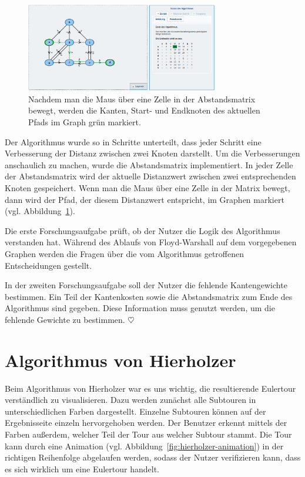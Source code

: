\begin{figure}[h!]
	\centering
	\includegraphics[width=0.75\textwidth]{figures/fw-matrix}
	\caption[Floyd-Warshall: Matrix]{Nachdem man die Maus über eine Zelle in der Abstandsmatrix bewegt, werden die Kanten, Start- und Endknoten des aktuellen Pfads im Graph grün markiert.}\label{fig:fw-matrix}
\end{figure}

Der Algorithmus wurde so in Schritte unterteilt, dass jeder Schritt eine Verbesserung der Distanz zwischen zwei Knoten darstellt. Um die Verbesserungen anschaulich zu machen, wurde die Abstandsmatrix implementiert. In jeder Zelle der Abstandsmatrix wird der aktuelle Distanzwert zwischen zwei entsprechenden Knoten gespeichert. Wenn man die Maus über eine Zelle in der Matrix bewegt, dann wird der Pfad, der diesem Distanzwert entspricht, im Graphen markiert (vgl. Abbildung~\ref{fig:fw-matrix}).

Die erste Forschungsaufgabe prüft, ob der Nutzer die Logik des Algorithmus verstanden hat. Während des Ablaufs von Floyd-Warshall auf dem vorgegebenen Graphen werden die Fragen über die vom Algorithmus getroffenen Entscheidungen gestellt.

In der zweiten Forschungsaufgabe soll der Nutzer die fehlende Kantengewichte bestimmen. Ein Teil der Kantenkosten sowie die Abstandsmatrix zum Ende des Algorithmus sind gegeben. Diese Information muss genutzt werden, um die fehlende Gewichte zu bestimmen. \hfill$\heartsuit$

\section{Algorithmus von Hierholzer} %
Beim Algorithmus von Hierholzer war es uns wichtig, die resultierende Eulertour verständlich zu visualisieren. Dazu werden zunächst alle Subtouren in unterschiedlichen Farben dargestellt. Einzelne Subtouren können auf der Ergebnisseite einzeln hervorgehoben werden. Der Benutzer erkennt mittels der Farben außerdem, welcher Teil der Tour aus welcher Subtour stammt. Die Tour kann durch eine Animation (vgl. Abbildung~\ref{fig:hierholzer-animation}) in der richtigen Reihenfolge abgelaufen werden, sodass der Nutzer verifizieren kann, dass es sich wirklich um eine Eulertour handelt.

